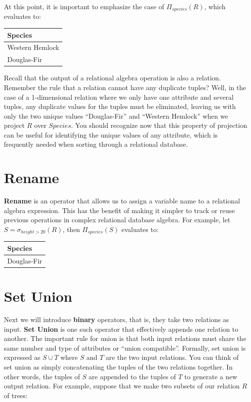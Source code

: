 \documentclass[
]{book}
\begin{document}
At this point, it is important to emphasize the case of \(Π_{species}(R)\), which evaluates to:

\begin{tabular}{l}
\toprule
Species\\
\midrule
Western Hemlock\\
Douglas-Fir\\
\bottomrule
\end{tabular}

Recall that the output of a relational algebra operation is also a relation. Remember the rule that a relation cannot have any duplicate tuples? Well, in the case of a 1-dimensional relation where we only have one attribute and several tuples, any duplicate values for the tuples must be eliminated, leaving us with only the two unique values ``Douglas-Fir'' and ``Western Hemlock'' when we project \(R\) over \(Species\). You should recognize now that this property of projection can be useful for identifying the unique values of any attribute, which is frequently needed when sorting through a relational database.

\hypertarget{rename}{%
\section{Rename}\label{rename}}

\textbf{Rename} is an operator that allows us to assign a variable name to a relational algebra expression. This has the benefit of making it simpler to track or reuse previous operations in complex relational database algebra. For example, let \(S = σ_{height>20}(R)\), then \(Π_{species}(S)\) evaluates to:

\begin{tabular}{l}
\toprule
Species\\
\midrule
Douglas-Fir\\
\bottomrule
\end{tabular}

\hypertarget{set-union}{%
\section{Set Union}\label{set-union}}

Next we will introduce \textbf{binary} operators, that is, they take two relations as input. \textbf{Set Union} is one such operator that effectively appends one relation to another. The important rule for union is that both input relations must share the same number and type of attributes or ``union compatible''. Formally, set union is expressed as \(S∪T\) where \(S\) and \(T\) are the two input relations. You can think of set union as simply concatenating the tuples of the two relations together. In other words, the tuples of \(S\) are appended to the tuples of \(T\) to generate a new output relation. For example, suppose that we make two subsets of our relation \(R\) of trees:
\end{document}
